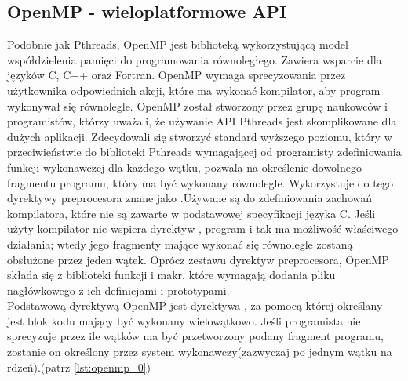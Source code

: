 \documentclass[document.tex]{subfiles}
\begin{document}
\subsection{OpenMP - wieloplatformowe API}\label{openmp_chapter}
\indent Podobnie jak Pthreads, OpenMP jest biblioteką wykorzystującą
model współdzielenia pamięci do programowania równoległego. Zawiera wsparcie dla języków C, C++ oraz Fortran.
OpenMP wymaga sprecyzowania przez użytkownika odpowiednich akcji, które ma wykonać kompilator, aby program wykonywał się równolegle.
\cite{openmp_pacheco}\cite{openmp_spec}
OpenMP został stworzony przez grupę naukowców i programistów, którzy
uważali, że używanie API Pthreads jest skomplikowane dla dużych
aplikacji. Zdecydowali się stworzyć standard wyższego poziomu, który
w przeciwieństwie do biblioteki Pthreads wymagającej od programisty zdefiniowania funkcji wykonawczej dla każdego wątku, pozwala 
na określenie dowolnego fragmentu programu, który ma być wykonany 
równolegle. Wykorzystuje do tego dyrektywy preprocesora znane jako
.Używane są do zdefiniowania zachowań kompilatora,
które nie są zawarte w podstawowej specyfikacji języka C.
Jeśli użyty kompilator nie wspiera dyrektyw , program
i tak ma możliwość właściwego działania; wtedy jego fragmenty mające wykonać
się równolegle zostaną obsłużone przez jeden wątek.
\cite{openmp_pacheco}\cite{C_King}\cite{openmp_spec}\cite{openmp_guide}
Oprócz zestawu dyrektyw preprocesora, OpenMP składa się z biblioteki
funkcji i makr, które wymagają dodania pliku nagłówkowego 
z ich definicjami i prototypami.
\\
\indent Podstawową dyrektywą OpenMP jest dyrektywa ,
za pomocą której określany jest blok kodu mający być wykonany wielowątkowo.
Jeśli programista nie sprecyzuje przez ile wątków
ma być przetworzony podany fragment programu, zostanie on określony przez system
wykonawczy(zazwyczaj po jednym wątku na rdzeń).\cite{openmp_pacheco}\cite{openmp_guide}(patrz \ref{lst:openmp_0})
\\

\end{document}
